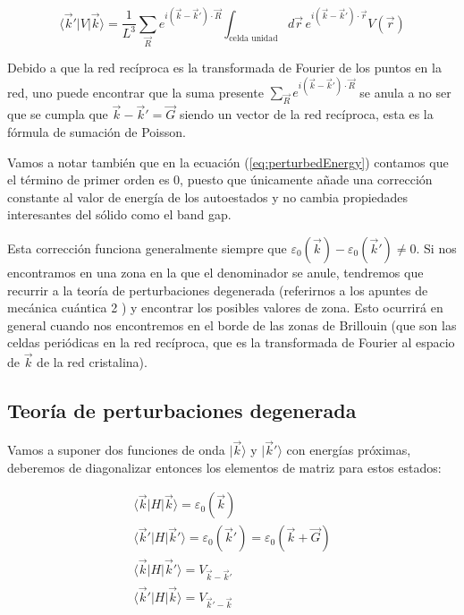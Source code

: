 \documentclass{article} %
\begin{document}
$$
\langle \vec{k}' | V | \vec{k} \rangle = \frac{1}{L^3} \sum_{\vec{R}} e^{i(\vec{k} - \vec{k}') \cdot \vec{R}} \int_{\text{celda unidad}} d\vec{r} \, e^{i(\vec{k}-\vec{k}')\cdot \vec{r}} V(\vec{r})
$$ 

Debido a que la red recíproca es la transformada de Fourier de los puntos en la red, uno puede encontrar que la suma presente $\sum_{\vec{R}} e^{i(\vec{k} - \vec{k}') \cdot \vec{R}}$ se anula a no ser que se cumpla que $\vec{k} - \vec{k}' = \vec{G}$ siendo un vector de la red recíproca, esta es la fórmula de sumación de Poisson.

Vamos a notar también que en la ecuación (\ref{eq:perturbedEnergy}) contamos que el término de primer orden es 0, puesto que únicamente añade una corrección constante al valor de energía de los autoestados y no cambia propiedades interesantes del sólido como el band gap.

Esta corrección funciona generalmente siempre que $\varepsilon_0(\vec{k}) - \varepsilon_0(\vec{k}') \neq 0$. Si nos encontramos en una zona en la que el denominador se anule, tendremos que recurrir a la teoría de perturbaciones degenerada (referirnos a los apuntes de mecánica cuántica 2 \cite{apuntesQM2}) y encontrar los posibles valores de zona. Esto ocurrirá en general cuando nos encontremos en el borde de las zonas de Brillouin (que son las celdas periódicas en la red recíproca, que es la transformada de Fourier al espacio de $\vec{k}$ de la red cristalina).

\subsection{Teoría de perturbaciones degenerada}

Vamos a suponer dos funciones de onda $|\vec{k}\rangle$ y $|\vec{k}'\rangle$ con energías próximas, deberemos de diagonalizar entonces los elementos de matriz para estos estados:

\begin{equation}
\begin{array}{c}
\langle \vec{k} | H | \vec{k} \rangle = \varepsilon_0(\vec{k}) \\
\langle \vec{k}' | H | \vec{k}' \rangle = \varepsilon_0(\vec{k}') = \varepsilon_0(\vec{k} + \vec{G}) \\
\langle \vec{k} | H | \vec{k}' \rangle = V_{\vec{k}-\vec{k}'} \\
\langle \vec{k}' | H | \vec{k} \rangle = V_{\vec{k}' - \vec{k}}
\end{array}
\end{equation}
\end{document}
